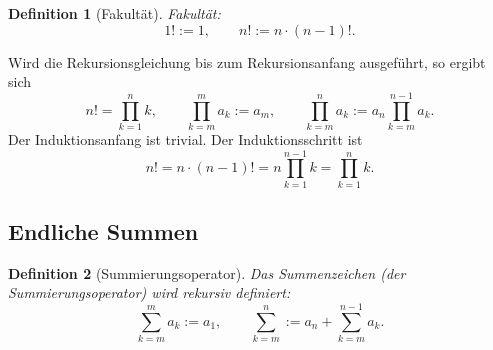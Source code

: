 \documentclass[a4paper,11pt,fleqn,twoside]{scrartcl}
\numberwithin{equation}{section}
\theoremstyle{rmbox}
\newtheorem{Definition}{Definition}
\newcommand{\emdef}[1]{\emph{#1}}
\begin{document}
\begin{Definition}[Fakultät]
\emdef{Fakultät}:
\begin{equation}
1!:=1,\qquad n! := n\cdot (n-1)!.
\end{equation}
\end{Definition}
\noindent
Wird die Rekursionsgleichung bis zum Rekursionsanfang ausgeführt,
so ergibt sich
\begin{equation}
n! = \prod_{k=1}^n k,
\qquad\prod_{k=m}^m a_k:=a_m,
\qquad\prod_{k=m}^n a_k := a_n\prod_{k=m}^{n-1} a_k.
\end{equation}
Der Induktionsanfang ist trivial. Der Induktionsschritt ist
\begin{equation}
n! = n\cdot (n-1)! = n\prod_{k=1}^{n-1} k = \prod_{k=1}^n k.
\end{equation}

\subsection{Endliche Summen}
\begin{Definition}[Summierungsoperator]
Das \emdef{Summenzeichen} (der \emdef{Summierungsoperator}) wird rekursiv
definiert:
\begin{equation}
\sum_{k=m}^m a_k := a_1,\qquad \sum_{k=m}^{n} := a_n+\sum_{k=m}^{n-1} a_k.
\end{equation}
\end{Definition}
\end{document}
